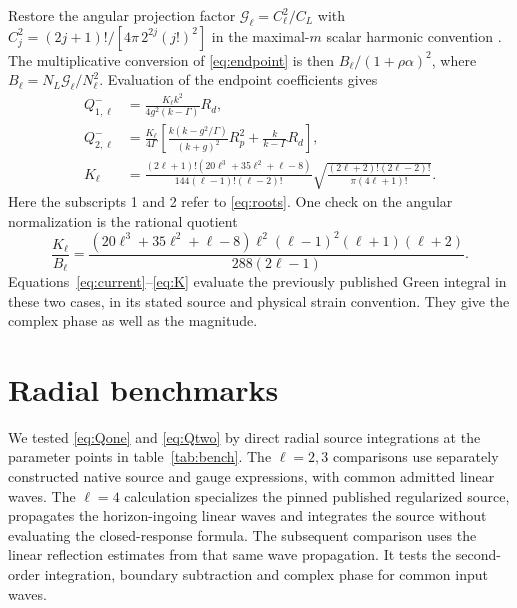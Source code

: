 \documentclass[11pt]{article}
\begin{document}
Restore the angular projection factor \(\mathcal G_\ell=C_\ell^2/C_L\) with
\(C_j^2=(2j+1)!/[4\pi\,2^{2j}(j!)^2]\)
in the maximal-\(m\) scalar harmonic convention \cite{bucciotti}.
The multiplicative conversion of \eqref{eq:endpoint} is then
\(B_\ell/(1+\rho\alpha)^2\), where \(B_\ell=N_L\mathcal G_\ell/N_\ell^2\).
Evaluation of the endpoint coefficients gives
\begin{align}
 Q^-_{1,\ell}
   &=\frac{K_\ell k^2}{4g^2(k-\Gamma)}R_d ,
 \label{eq:Qone}\\
 Q^-_{2,\ell}
   &=\frac{K_\ell}{4\Gamma}\left[
        \frac{k(k-g^2/\Gamma)}{(k+g)^2}R_p^2
       +\frac{k}{k-\Gamma}R_d
     \right] ,
 \label{eq:Qtwo}\\
 K_\ell
   &=\frac{(2\ell+1)!(20\ell^3+35\ell^2+\ell-8)}
           {144(\ell-1)!(\ell-2)!}
     \sqrt{\frac{(2\ell+2)!(2\ell-2)!}{\pi(4\ell+1)!}} .
 \label{eq:K}
\end{align}
Here the subscripts 1 and 2 refer to \eqref{eq:roots}.
One check on the angular normalization is the rational quotient
\begin{equation}
 \frac{K_\ell}{B_\ell}
 =\frac{(20\ell^3+35\ell^2+\ell-8)\ell^2(\ell-1)^2(\ell+1)(\ell+2)}
        {288(2\ell-1)} .
 \label{eq:KoverB}
\end{equation}
Equations~\eqref{eq:current}--\eqref{eq:K} evaluate the previously published Green integral in these two cases, in its stated source and physical strain convention.
They give the complex phase as well as the magnitude.

\section{Radial benchmarks}
\label{sec:numerics}

We tested \eqref{eq:Qone} and \eqref{eq:Qtwo} by direct radial source integrations at the parameter points in table~\ref{tab:bench}.
The \(\ell=2,3\) comparisons use separately constructed native source and gauge expressions, with common admitted linear waves.
The \(\ell=4\) calculation specializes the pinned published regularized source, propagates the horizon-ingoing linear waves and integrates the source without evaluating the closed-response formula.
The subsequent comparison uses the linear reflection estimates from that same wave propagation.
It tests the second-order integration, boundary subtraction and complex phase for common input waves.
\end{document}
